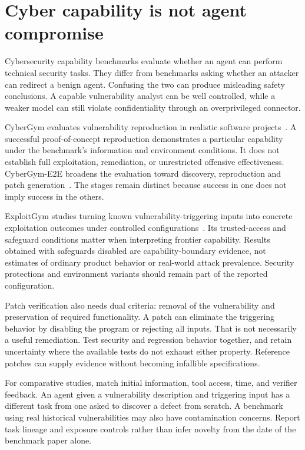 \section{Cyber capability is not agent compromise}\label{sec:C28:cybercapability}
Cybersecurity capability benchmarks evaluate whether an agent can perform technical security tasks. They differ from benchmarks asking whether an attacker can redirect a benign agent. Confusing the two can produce misleading safety conclusions. A capable vulnerability analyst can be well controlled, while a weaker model can still violate confidentiality through an overprivileged connector.

CyberGym evaluates vulnerability reproduction in realistic software projects~\cite{corpus250602548}. A successful proof-of-concept reproduction demonstrates a particular capability under the benchmark's information and environment conditions. It does not establish full exploitation, remediation, or unrestricted offensive effectiveness. CyberGym-E2E broadens the evaluation toward discovery, reproduction and patch generation~\cite{corpus260604460}. The stages remain distinct because success in one does not imply success in the others.

ExploitGym studies turning known vulnerability-triggering inputs into concrete exploitation outcomes under controlled configurations~\cite{corpus260511086}. Its trusted-access and safeguard conditions matter when interpreting frontier capability. Results obtained with safeguards disabled are capability-boundary evidence, not estimates of ordinary product behavior or real-world attack prevalence. Security protections and environment variants should remain part of the reported configuration.

Patch verification also needs dual criteria: removal of the vulnerability and preservation of required functionality. A patch can eliminate the triggering behavior by disabling the program or rejecting all inputs. That is not necessarily a useful remediation. Test security and regression behavior together, and retain uncertainty where the available tests do not exhaust either property. Reference patches can supply evidence without becoming infallible specifications.

For comparative studies, match initial information, tool access, time, and verifier feedback. An agent given a vulnerability description and triggering input has a different task from one asked to discover a defect from scratch. A benchmark using real historical vulnerabilities may also have contamination concerns. Report task lineage and exposure controls rather than infer novelty from the date of the benchmark paper alone.

